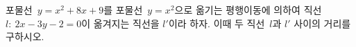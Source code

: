 포물선~$y=x^2+8x+9$를 포물선~$y=x^2$으로 옮기는 평행이동에 의하여 직선~$l:\ 2x-3y-2=0$이 옮겨지는 직선을 $l'$이라 하자. 이때 두 직선~$l$과 $l'$ 사이의 거리를 구하시오.
